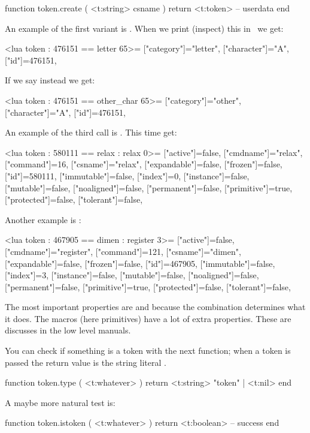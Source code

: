 function token.create ( <t:string> csname )
    return <t:token> -- userdata
end
\stoptyping

An example of the first variant is . When we
print (inspect) this in \CONTEXT\ we get:

\starttyping[option=LUA]
<lua token : 476151 == letter 65>={
 ["category"]="letter",
 ["character"]="A",
 ["id"]=476151,
}
\stoptyping

If we say  instead we get:

\starttyping[option=LUA]
<lua token : 476151 == other_char 65>={
 ["category"]="other",
 ["character"]="A",
 ["id"]=476151,
}
\stoptyping

An example of the third call is . This time get:

\starttyping[option=LUA]
<lua token : 580111 == relax : relax 0>={
 ["active"]=false,
 ["cmdname"]="relax",
 ["command"]=16,
 ["csname"]="relax",
 ["expandable"]=false,
 ["frozen"]=false,
 ["id"]=580111,
 ["immutable"]=false,
 ["index"]=0,
 ["instance"]=false,
 ["mutable"]=false,
 ["noaligned"]=false,
 ["permanent"]=false,
 ["primitive"]=true,
 ["protected"]=false,
 ["tolerant"]=false,
}
\stoptyping

Another example is :

\starttyping[option=LUA]
<lua token : 467905 == dimen : register 3>={
 ["active"]=false,
 ["cmdname"]="register",
 ["command"]=121,
 ["csname"]="dimen",
 ["expandable"]=false,
 ["frozen"]=false,
 ["id"]=467905,
 ["immutable"]=false,
 ["index"]=3,
 ["instance"]=false,
 ["mutable"]=false,
 ["noaligned"]=false,
 ["permanent"]=false,
 ["primitive"]=true,
 ["protected"]=false,
 ["tolerant"]=false,
}
\stoptyping

The most important properties are  and  because the
combination determines what it does. The macros (here primitives) have a lot of extra
properties. These are discusses in the low level manuals.

You can check if something is a token with the next function; when a token is
passed the return value is the string literal .

\starttyping[option=LUA]
function token.type ( <t:whatever> )
    return <t:string> "token" | <t:nil>
end
\stoptyping

A maybe more natural test is:

\starttyping[option=LUA]
function token.istoken ( <t:whatever> )
    return <t:boolean> -- success
end
\stoptyping

